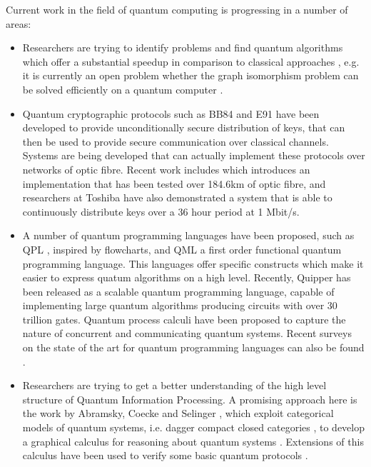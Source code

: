\documentclass[a4paper]{article}
\begin{document}
Current work in the field of quantum computing is progressing in a number 
of areas:
\begin{itemize}
\item
Researchers are trying to identify problems and find quantum algorithms which
offer a substantial speedup in comparison to classical approaches
, e.g. it is currently an open problem whether the graph
isomorphism problem can be solved efficiently on a quantum computer
.  
\item
Quantum cryptographic protocols such as BB84  and E91
 have been developed to provide unconditionally secure
distribution of keys, that can then be used to provide secure
communication over classical channels. Systems are being developed
that can actually implement these protocols over networks of optic
fibre. Recent work includes  which introduces an
implementation that has been tested over 184.6km of optic fibre, 
and researchers at Toshiba  have also
demonstrated a system that is able to continuously distribute keys
over a 36 hour period at 1 Mbit/s. 
\item 
A number of quantum programming languages have been proposed,
  such as QPL , inspired by flowcharts, and QML
   a first order functional quantum
  programming language. This languages offer specific constructs which
  make it easier to express quatum algorithms on a high
  level. Recently, Quipper  has
  been released as a scalable quantum programming language, capable of
  implementing large quantum algorithms producing circuits with over
  30 trillion gates. Quantum process calculi  have been
  proposed to capture the nature of concurrent and communicating
  quantum systems.  Recent surveys on the state of the art for quantum
  programming languages can also be found
  .
\item
Researchers are trying 
to get a better understanding of the
high level structure of Quantum Information Processing. A promising approach here
is the work by Abramsky, Coecke and Selinger , 
which exploit
categorical models of quantum systems, i.e. dagger compact closed
categories , to develop a graphical calculus for reasoning about
quantum systems . Extensions of this calculus have been
used to verify some basic quantum protocols . 
\end{itemize}
\end{document}
